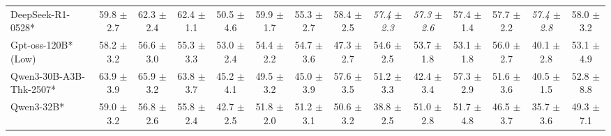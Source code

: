 \documentclass{llmxive}
\begin{document}
\begin{table}[hbt]
{\begin{tabular}{l *{13}{c}}
 DeepSeek-R1-0528* &
59.8 {\tiny$\pm$ 2.7} &
62.3 {\tiny$\pm$ 2.4} &
62.4 {\tiny$\pm$ 1.1} &
50.5 {\tiny$\pm$ 4.6} &
59.9 {\tiny$\pm$ 1.7} &
55.3 {\tiny$\pm$ 2.7} &
58.4 {\tiny$\pm$ 2.5} &
\it{57.4} {\tiny$\pm$ 2.3} &
\it{57.3} {\tiny$\pm$ 2.6} &
57.4 {\tiny$\pm$ 1.4} &
57.7 {\tiny$\pm$ 2.2} &
\it{57.4} {\tiny$\pm$ 2.8} &
58.0 {\tiny$\pm$ 3.2} \\
  

\rowcolor{gray!10}
Gpt-oss-120B* (Low)&
58.2 {\tiny$\pm$ 3.2}&	
56.6 {\tiny$\pm$ 3.0}&	
55.3 {\tiny$\pm$ 3.3}&	
53.0 {\tiny$\pm$ 2.4}&	
54.4 {\tiny$\pm$ 2.2}&	
54.7 {\tiny$\pm$ 3.6}&	
47.3 {\tiny$\pm$ 2.7}&	
54.6 {\tiny$\pm$ 2.5}&	
53.7 {\tiny$\pm$ 1.8}&	
53.1 {\tiny$\pm$ 1.8}&	
56.0 {\tiny$\pm$ 2.7}&	
40.1 {\tiny$\pm$ 2.8}&	
53.1 {\tiny$\pm$ 4.9}\\	


Qwen3-30B-A3B-Thk-2507* &
63.9 {\tiny$\pm$ 3.9} &
65.9 {\tiny$\pm$ 3.2} &
63.8 {\tiny$\pm$ 3.7} &
45.2 {\tiny$\pm$ 4.1} &
49.5 {\tiny$\pm$ 3.2} &
45.0 {\tiny$\pm$ 3.9} &
57.6 {\tiny$\pm$ 3.5} &
51.2 {\tiny$\pm$ 3.3} &
42.4 {\tiny$\pm$ 3.4} &
57.3 {\tiny$\pm$ 2.9} &
51.6 {\tiny$\pm$ 3.6} &
40.5 {\tiny$\pm$ 1.5} &
52.8 {\tiny$\pm$ 8.8} \\
 
\rowcolor{gray!10}
Qwen3-32B* &
59.0 {\tiny$\pm$ 3.2} &
56.8 {\tiny$\pm$ 2.6} &
55.8 {\tiny$\pm$ 2.4} &
42.7 {\tiny$\pm$ 2.5} &
51.8 {\tiny$\pm$ 2.0} &
51.2 {\tiny$\pm$ 3.1} &
50.6 {\tiny$\pm$ 3.2} &
38.8 {\tiny$\pm$ 2.5} &
51.0 {\tiny$\pm$ 2.8} &
51.7 {\tiny$\pm$ 4.8} &
46.5 {\tiny$\pm$ 3.7} &
35.7 {\tiny$\pm$ 3.6} &
49.3 {\tiny$\pm$ 7.1} \\




\end{tabular}}
\end{table}
\end{document}
